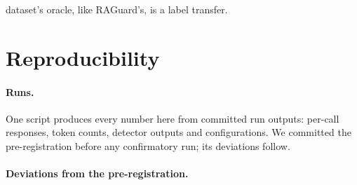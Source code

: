 dataset's oracle, like RAGuard's, is a label transfer.

\section{Reproducibility}
\label{app:repro}
\paragraph{Runs.} One script produces every number here from committed run outputs: per-call responses,
token counts, detector outputs and configurations. We committed the pre-registration before any confirmatory run;
its deviations follow.

\paragraph{Deviations from the pre-registration.}
